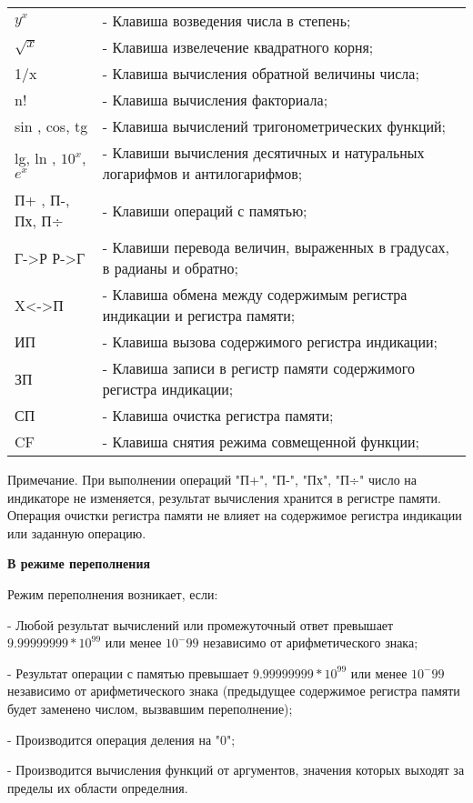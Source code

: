 \documentclass[12pt]{article} %
\begin{document}
\begin{tabular}{ p{3.5cm} p{9cm} }
$y^x$ & - Клавиша возведения числа в степень; \\
$\sqrt{x}$ & - Клавиша извелечение квадратного корня; \\
1/x & - Клавиша вычисления обратной величины числа; \\
n! & - Клавиша вычисления факториала; \\
sin , cos, tg & - Клавиша вычислений тригонометрических функций; \\
lg, ln , $10^x$, $e^x$ & - Клавиши вычисления десятичных и натуральных логарифмов и антилогарифмов; \\
П+ , П-, Пх, П÷ & - Клавиши операций с памятью; \\
Г->Р  Р->Г & - Клавиши перевода величин, выраженных в градусах, в радианы и обратно; \\
X<->П & - Клавиша обмена между содержимым регистра индикации и регистра памяти; \\
ИП & - Клавиша вызова содержимого регистра индикации; \\
ЗП & - Клавиша записи в регистр памяти содержимого регистра индикации; \\
СП & - Клавиша очистка регистра памяти; \\
CF & - Клавиша снятия режима совмещенной функции; \\
\end{tabular}


Примечание. При выполнении операций "П+", "П-", "Пх", "П÷" число на индикаторе не изменяется, результат вычисления хранится в регистре памяти.
Операция очистки регистра памяти не влияет на содержимое регистра индикации или заданную операцию.

\vspace{0.5cm}
\textbf{В режиме переполнения}

Режим переполнения возникает, если:

- Любой результат вычислений или промежуточный ответ превышает $9.99999999 * 10^99$ или менее $10^-99$ независимо от арифметического знака;

- Результат операции с памятью превышает $9.99999999 * 10^99$ или менее $10^-99$ независимо от арифметического знака (предыдущее содержимое регистра памяти будет заменено числом, вызвавшим переполнение);

- Производится операция деления на "0";

- Производится вычисления функций от аргументов, значения которых выходят за пределы их области определния.
\end{document}
